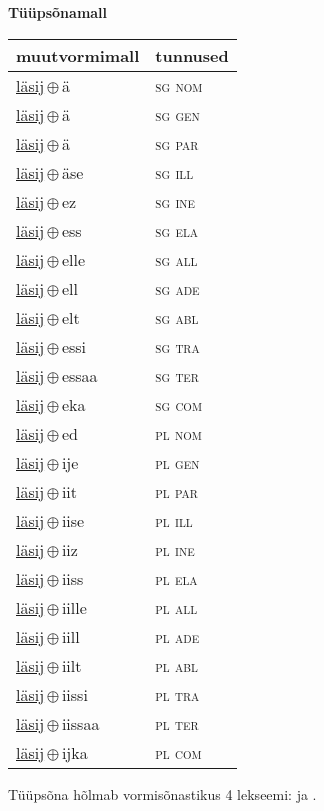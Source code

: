 

\vspace{3.5em}
\noindent \begin{minipage}{\textwidth}
\noindent \textbf{Tüüpsõnamall \,}\\

\begin{sideways}
\begin{tabular}{l l}
muutvormimall & tunnused \\
\hline
\underline{läsij}\,$\oplus$\,ä & \textsc{ sg nom } \\
\underline{läsij}\,$\oplus$\,ä & \textsc{ sg gen } \\
\underline{läsij}\,$\oplus$\,ä & \textsc{ sg par } \\
\underline{läsij}\,$\oplus$\,äse & \textsc{ sg ill } \\
\underline{läsij}\,$\oplus$\,ez & \textsc{ sg ine } \\
\underline{läsij}\,$\oplus$\,ess & \textsc{ sg ela } \\
\underline{läsij}\,$\oplus$\,elle & \textsc{ sg all } \\
\underline{läsij}\,$\oplus$\,ell & \textsc{ sg ade } \\
\underline{läsij}\,$\oplus$\,elt & \textsc{ sg abl } \\
\underline{läsij}\,$\oplus$\,essi & \textsc{ sg tra } \\
\underline{läsij}\,$\oplus$\,essaa & \textsc{ sg ter } \\
\underline{läsij}\,$\oplus$\,eka & \textsc{ sg com } \\
\underline{läsij}\,$\oplus$\,ed & \textsc{ pl nom } \\
\underline{läsij}\,$\oplus$\,ije & \textsc{ pl gen } \\
\underline{läsij}\,$\oplus$\,iit & \textsc{ pl par } \\
\underline{läsij}\,$\oplus$\,iise & \textsc{ pl ill } \\
\underline{läsij}\,$\oplus$\,iiz & \textsc{ pl ine } \\
\underline{läsij}\,$\oplus$\,iiss & \textsc{ pl ela } \\
\underline{läsij}\,$\oplus$\,iille & \textsc{ pl all } \\
\underline{läsij}\,$\oplus$\,iill & \textsc{ pl ade } \\
\underline{läsij}\,$\oplus$\,iilt & \textsc{ pl abl } \\
\underline{läsij}\,$\oplus$\,iissi & \textsc{ pl tra } \\
\underline{läsij}\,$\oplus$\,iissaa & \textsc{ pl ter } \\
\underline{läsij}\,$\oplus$\,ijka & \textsc{ pl com } \\
\end{tabular}
\end{sideways}
\label{tab:tüüpsõnamall-läsijä}

\end{minipage}

 
\vspace{1em}
\noindent Tüüpsõna hõlmab vormisõnastikus 4 lekseemi:  ja .
